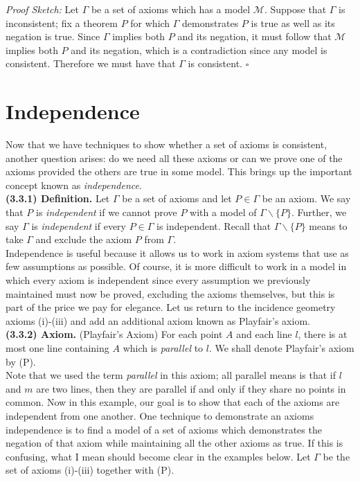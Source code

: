 \documentclass[12pt]{book}
\def\cM{{\mathcal{M}}}
\newenvironment{proofsketch}{\noindent\textit{Proof Sketch:}}{\hfill$\square$}
\def\header #1{\noindent\textbf{#1}}
\begin{document}
\begin{proofsketch}	
Let $\Gamma$ be a set of axioms which has a model $\cM$. Suppose that $\Gamma$ is inconsistent; fix a theorem $P$ for which $\Gamma$ demonstrates $P$ is true as well as its negation is true. Since $\Gamma$ implies both $P$ and its negation, it must follow that $\cM$ implies both $P$ and its negation, which is a contradiction since any model is consistent. Therefore we must have that $\Gamma$ is consistent.
\end{proofsketch}

\section{Independence}

Now that we have techniques to show whether a set of axioms is consistent, another question arises: do we need all these axioms or can we prove one of the axioms provided the others are true in some model. This brings up the important concept known as \textit{independence}.\\

\header{(3.3.1) Definition.} Let $\Gamma$ be a set of axioms and let $P\in\Gamma$ be an axiom. We say that $P$ is \textit{independent} if we cannot prove $P$ with a model of $\Gamma\backslash\{P\}$. Further, we say $\Gamma$ is \textit{independent} if every $P\in\Gamma$ is independent. Recall that $\Gamma\backslash\{P\}$ means to take $\Gamma$ and exclude the axiom $P$ from $\Gamma$.\\

Independence is useful because it allows us to work in axiom systems that use as few assumptions as possible. Of course, it is more difficult to work in a model in which every axiom is independent since every assumption we previously maintained must now be proved, excluding the axioms themselves, but this is part of the price we pay for elegance. Let us return to the incidence geometry axioms (i)-(iii) and add an additional axiom known as Playfair's axiom. \\

\header{(3.3.2) Axiom.} (Playfair's Axiom) For each point $A$ and each line $l$, there is at most one line containing $A$ which is \textit{parallel} to $l$. We shall denote Playfair's axiom by (P).\\

Note that we used the term \textit{parallel} in this axiom; all parallel means is that if $l$ and $m$ are two lines, then they are parallel if and only if they share no points in common. Now in this example, our goal is to show that each of the axioms are independent from one another. One technique to demonstrate an axioms independence is to find a model of a set of axioms which demonstrates the negation of that axiom while maintaining all the other axioms as true. If this is confusing, what I mean should become clear in the examples below. Let $\Gamma$ be the set of axioms (i)-(iii) together with (P). 
\end{document}
